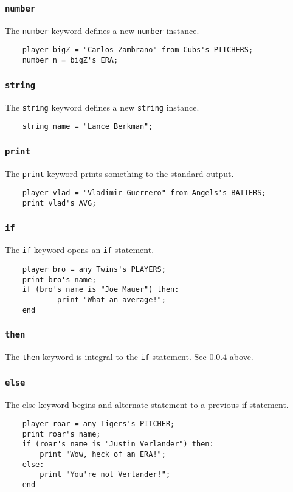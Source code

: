 \subsubsection{\texttt{number}}
The \texttt{number} keyword defines a new \texttt{number} instance.
\begin{verbatim}
    player bigZ = "Carlos Zambrano" from Cubs's PITCHERS;
    number n = bigZ's ERA;
\end{verbatim}

\subsubsection{\texttt{string}}
The \texttt{string} keyword defines a new \texttt{string} instance. 
\begin{verbatim}
    string name = "Lance Berkman";
\end{verbatim}

\subsubsection{\texttt{print}}
The \texttt{print} keyword prints something to the standard output.
\begin{verbatim}
    player vlad = "Vladimir Guerrero" from Angels's BATTERS;
    print vlad's AVG;
\end{verbatim}

\subsubsection{\texttt{if}} \label{if}
The \texttt{if} keyword opens an \texttt{if} statement.
\begin{verbatim}
    player bro = any Twins's PLAYERS;
    print bro's name;
    if (bro's name is "Joe Mauer") then:
            print "What an average!";
    end
\end{verbatim}

\subsubsection{\texttt{then}}
The \texttt{then} keyword is integral to the \texttt{if} statement. See \ref{if} above.

\subsubsection{\texttt{else}}
The else keyword begins and alternate statement to a previous if statement.
\begin{verbatim}
    player roar = any Tigers's PITCHER;
    print roar's name;
    if (roar's name is "Justin Verlander") then:
        print "Wow, heck of an ERA!";
    else:
        print "You're not Verlander!";
    end
\end{verbatim}

